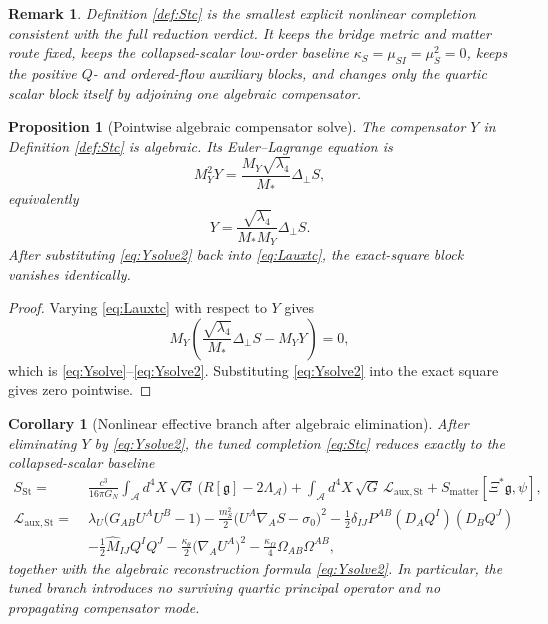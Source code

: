 \documentclass[11pt]{article}
\newcommand{\Sub}{\mathcal{A}}
\newcommand{\BridgeMetric}{\mathfrak{g}}
\newtheorem{proposition}{Proposition}
\newtheorem{remark}{Remark}
\newtheorem{corollary}{Corollary}
\begin{document}
\begin{remark}
Definition \ref{def:Stc} is the smallest explicit nonlinear completion consistent with the full reduction verdict. It keeps the bridge metric and matter route fixed, keeps the collapsed-scalar low-order baseline \(\kappa_S=\mu_{SI}=\mu_S^2=0\), keeps the positive \(Q\)- and ordered-flow auxiliary blocks, and changes only the quartic scalar block itself by adjoining one algebraic compensator.
\end{remark}

\begin{proposition}[Pointwise algebraic compensator solve]
\label{prop:Ysolve}
The compensator \(Y\) in Definition \ref{def:Stc} is algebraic. Its Euler--Lagrange equation is
\begin{equation}
M_Y^2 Y
=
\frac{M_Y\sqrt{\lambda_4}}{M_*}\Delta_\perp S,
\label{eq:Ysolve}
\end{equation}
equivalently
\begin{equation}
Y
=
\frac{\sqrt{\lambda_4}}{M_*M_Y}\Delta_\perp S.
\label{eq:Ysolve2}
\end{equation}
After substituting \eqref{eq:Ysolve2} back into \eqref{eq:Lauxtc}, the exact-square block vanishes identically.
\end{proposition}

\begin{proof}
Varying \eqref{eq:Lauxtc} with respect to \(Y\) gives
\[
M_Y
\left(
\frac{\sqrt{\lambda_4}}{M_*}\Delta_\perp S
-M_Y Y
\right)=0,
\]
which is \eqref{eq:Ysolve}--\eqref{eq:Ysolve2}. Substituting \eqref{eq:Ysolve2} into the exact square gives zero pointwise.
\end{proof}

\begin{corollary}[Nonlinear effective branch after algebraic elimination]
\label{cor:Seff}
After eliminating \(Y\) by \eqref{eq:Ysolve2}, the tuned completion \eqref{eq:Stc} reduces exactly to the collapsed-scalar baseline
\begin{align}
S_{\mathrm{St}}
=\;&
\frac{c^3}{16\pi G_N}
\int_{\Sub} d^4X\,\sqrt{G}\,\bigl(R[\BridgeMetric]-2\Lambda_{\Sub}\bigr)
+ \int_{\Sub} d^4X\,\sqrt{G}\,\mathcal L_{\mathrm{aux,St}}
+ S_{\mathrm{matter}}[\Xi^*\BridgeMetric,\psi],
\label{eq:SSt}
\\
\mathcal L_{\mathrm{aux,St}}
=\;&
\lambda_U\bigl(G_{AB}U^AU^B-1\bigr)
-\frac{m_S^2}{2}\bigl(U^A\nabla_A S-\sigma_0\bigr)^2
-\frac12\delta_{IJ}P^{AB}(D_AQ^I)(D_BQ^J)
\nonumber\\
&-\frac12\widehat M_{IJ}Q^IQ^J
-\frac{\kappa_\theta}{2}\bigl(\nabla_AU^A\bigr)^2
-\frac{\kappa_\Omega}{4}\Omega_{AB}\Omega^{AB},
\label{eq:LauxSt}
\end{align}
together with the algebraic reconstruction formula \eqref{eq:Ysolve2}. In particular, the tuned branch introduces no surviving quartic principal operator and no propagating compensator mode.
\end{corollary}
\end{document}
